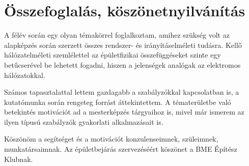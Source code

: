 \chapter*{Összefoglalás, köszönetnyilvánítás}

A félév során egy olyan témakörrel foglalkoztam, amihez szükség volt az alapképzés során szerzett összes rendszer- és irányításelméleti tudásra. Kellő hálózatelméleti szemlélettel az épületfizikai összefüggéseket szinte egy betűcserével be lehetett fogadni, hiszen a jelenségek analógak az elektromos hálózatokkal.

Számos tapasztalattal lettem gazdagabb a szabályzókkal kapcsolatban is, a kutatómunka során rengeteg forrást áttekintettem. A tématerületbe való betekintés motivációt ad a mesterképzés tárgyaihoz is, mivel már ismerem az ilyen típusú szabályzók gyakorlati alkalmazásait is.

Köszönöm a segítséget és a motivációt konzulenseimnek, szüleimnek, munkatársaimnak. Az épületbejárás szervezéséért köszönet a BME Építész Klubnak.